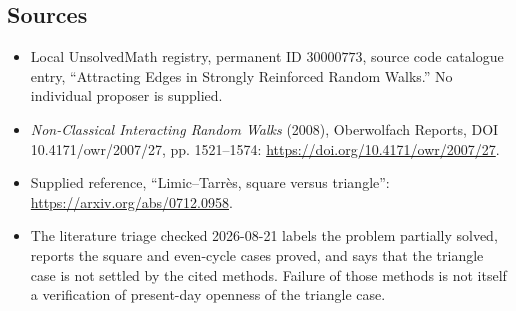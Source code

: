 \documentclass[11pt]{article}
\begin{document}
\subsection{Sources}
\begin{itemize}
\item Local UnsolvedMath registry, permanent ID \(30000773\), source code catalogue entry, ``Attracting Edges in Strongly Reinforced Random Walks.'' No individual proposer is supplied.
\item \emph{Non-Classical Interacting Random Walks} (2008), Oberwolfach Reports, DOI 10.4171/owr/2007/27, pp. 1521--1574: \url{https://doi.org/10.4171/owr/2007/27}.
\item Supplied reference, ``Limic--Tarr\`es, square versus triangle'': \url{https://arxiv.org/abs/0712.0958}.
\item The literature triage checked 2026-08-21 labels the problem partially solved, reports the square and even-cycle cases proved, and says that the triangle case is not settled by the cited methods. Failure of those methods is not itself a verification of present-day openness of the triangle case.
\end{itemize}
\end{document}
